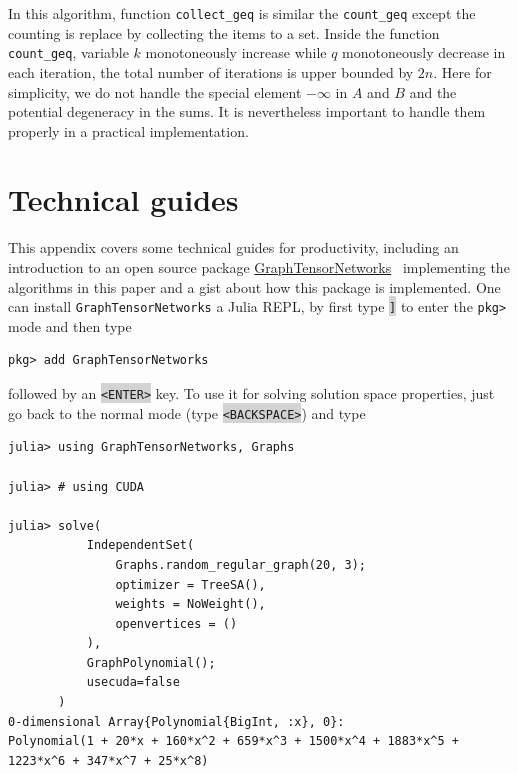 \documentclass[onefignum, onetabnum]{siamart190516}
\newcommand{\<}{\langle}
\renewcommand{\>}{\rangle}
\begin{document}
In this algorithm, function \texttt{collect\_geq} is similar the \texttt{count\_geq} except the counting is replace by collecting the items to a set.
Inside the function \texttt{count\_geq}, variable $k$ monotoneously increase while $q$ monotoneously decrease in each iteration,
the total number of iterations is upper bounded by $2n$.
Here for simplicity, we do not handle the special element $-\infty$ in $A$ and $B$ and the potential degeneracy in the sums.
It is nevertheless important to handle them properly in a practical implementation.

\section{Technical guides}\label{sec:technical}

This appendix covers some technical guides for productivity, including an introduction to an open source package \href{https://github.com/Happy-Diode/GraphTensorNetworks.jl}{GraphTensorNetworks}~\cite{GraphTensorNetworks} implementing the algorithms in this paper and a gist about how this package is implemented.
One can install \texttt{GraphTensorNetworks} a Julia REPL, by first type \colorbox{lightgray}{\texttt{]}} to enter the \texttt{pkg>} mode and then type
\begin{lstlisting}
pkg> add GraphTensorNetworks
\end{lstlisting}
followed by an \colorbox{lightgray}{\texttt{<ENTER>}} key.
To use it for solving solution space properties, just go back to the normal mode (type \colorbox{lightgray}{\texttt{<BACKSPACE>}}) and type

\begin{lstlisting}
julia> using GraphTensorNetworks, Graphs

julia> # using CUDA

julia> solve(
           IndependentSet(
               Graphs.random_regular_graph(20, 3);
               optimizer = TreeSA(),
               weights = NoWeight(),
               openvertices = ()
           ),
           GraphPolynomial();
           usecuda=false
       )
0-dimensional Array{Polynomial{BigInt, :x}, 0}:
Polynomial(1 + 20*x + 160*x^2 + 659*x^3 + 1500*x^4 + 1883*x^5 + 1223*x^6 + 347*x^7 + 25*x^8)
\end{lstlisting}
\end{document}
